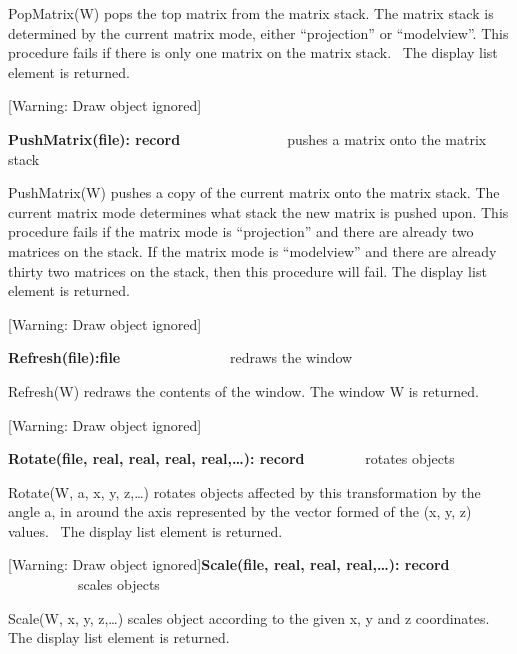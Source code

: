 \documentclass[letterpaper]{article}
\begin{document}
\bigskip

{
\textsf{PopMatrix(W)} pops the top matrix from the matrix stack. The matrix stack is determined by the current matrix
mode, either \textsf{{}``projection''} or \textsf{{}``modelview''.} This procedure fails if there is only one matrix on
the matrix stack. \ The display list element is returned. }

[Warning: Draw object ignored]

{
\textsf{\textbf{PushMatrix(file): record}}\textbf{\ \ }\ \ \ \  \ \ \ \ \ \ \ \ \ pushes a matrix onto the matrix stack}


\bigskip

{
\textsf{PushMatrix(W)} pushes a copy of the current matrix onto the matrix stack. The current matrix mode determines
what stack the new matrix is pushed upon. This procedure fails if the matrix mode is \textsf{{}``projection''} and
there are already two matrices on the stack. If the matrix mode is \textsf{{}``modelview''} and there are already
thirty two matrices on the stack, then this procedure will fail. The display list element is returned.}

[Warning: Draw object ignored]

{
\textsf{\textbf{Refresh(file):file}} \ \ \ \ \ \ \ \ \ \ \ \ \ \  \ redraws the window }


\bigskip

{
\textsf{Refresh(W) }redraws the contents of the window. The window W is returned. }

[Warning: Draw object ignored]

{
\textsf{\textbf{Rotate(file, real, real, real, real,{\dots}): record}} \ \ \ \ \ \ \ \ rotates objects }


\bigskip

{
\textsf{Rotate(W, a, x, y, z,{\dots})} rotates objects affected by this transformation by the angle a, in around the
axis represented by the vector formed of the (x, y, z) values. \ The display list element is returned.}


\bigskip

{
[Warning: Draw object ignored]\textsf{\textbf{Scale(file, real, real, real,{\dots}): record}} \ \ \ \ \ \ \ \ \ \ 
scales objects}


\bigskip

{
\textsf{Scale(W, x, y, z,{\dots})} scales object according to the given x, y and z coordinates. The display list element
is returned.}
\end{document}
